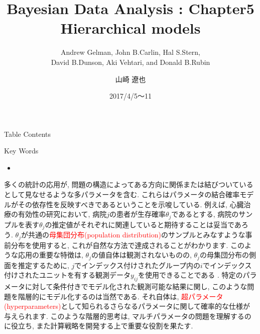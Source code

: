 \documentclass[10pt,dvipdfmx,a4]{beamer}
\title{Bayesian Data Analysis : Chapter5 \\Hierarchical models}
\subtitle{Andrew Gelman, John B.Carlin, Hal S.Stern,\\David B.Dunson, Aki Vehtari, and Donald B.Rubin}
\author{山崎 遼也}
\institute{情報学科 数理工学コース 4回}
\date{2017/4/5～11}
\newcommand{\tcr}[1]{\textcolor{red}{#1}}
\begin{document}
\frame{\titlepage}

\begin{frame}{Table Contents}
\begin{multicols}{2}
{\scriptsize \tableofcontents}
\end{multicols}
\end{frame}

\begin{frame}{Key Words}
\begin{multicols}{2}
{\scriptsize \begin{itemize}
\item 
\end{itemize}}
\end{multicols}
\end{frame}


\begin{frame}
多くの統計の応用が, 問題の構造によってある方向に関係または結びついているとして見なせるような多パラメータを含む.
これらはパラメータの結合確率モデルがその依存性を反映すべきであるということを示唆している.
例えば, 心臓治療の有効性の研究において, 病院$j$の患者が生存確率$\theta_j$であるとする, 病院のサンプルを表す$\theta_j$の推定値がそれぞれに関連していると期待することは妥当であろう.
$\theta_j$が共通の\tcr{母集団分布(population distribution)}のサンプルとみなすような事前分布を使用すると, これが自然な方法で達成されることがわかります.
このような応用の重要な特徴は, $\theta_j$の値自体は観測されないものの, $\theta_j$の母集団分布の側面を推定するために, $j$でインデックス付けされたグループ内の$i$でインデックス付けされたユニットを有する観測データ$y_{ij}$を使用できることである .
特定のパラメータに対して条件付きでモデル化された観測可能な結果に関し, このような問題を階層的にモデル化するのは当然である.
それ自体は, \tcr{超パラメータ(hyperparameters)}として知られるさらなるパラメータに関して確率的な仕様が与えられます.
このような階層的思考は, マルチパラメータの問題を理解するのに役立ち, また計算戦略を開発する上で重要な役割を果たす.
\end{frame}

\end{document}

